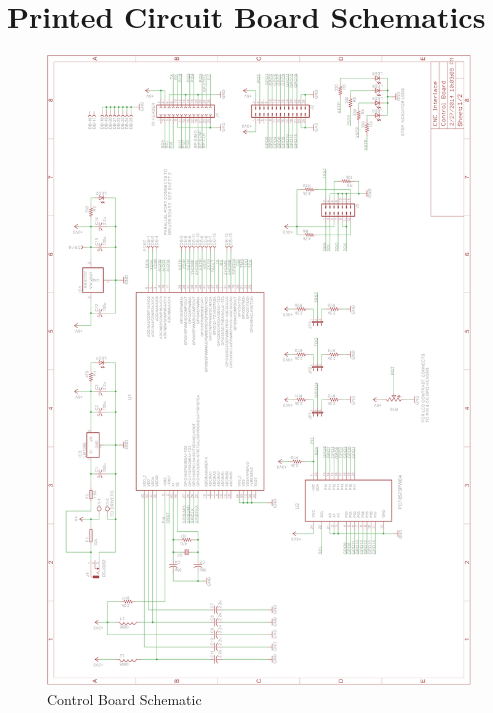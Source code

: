 \chapter{Printed Circuit Board Schematics}

\begin{figure}[H]
	\centering
	\includegraphics[width=.775\textwidth]{pcb-design/cschematic.png}
	\caption{Control Board Schematic}
	\label{fig:control-schematic}
\end{figure}

